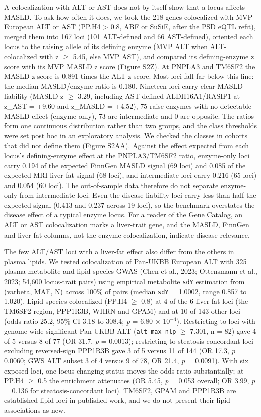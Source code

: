 A colocalization with ALT or AST does not by itself show that a locus affects MASLD. To ask how often it does, we took the 218 genes colocalized with MVP European ALT or AST (PP.H4 \textgreater{} 0.8, ABF or SuSiE, after the PSD eQTL refit), merged them into 167 loci (101 ALT-defined and 66 AST-defined), oriented each locus to the raising allele of its defining enzyme (MVP ALT when ALT-colocalized with \textbar z\textbar{} $\ge$ 5.45, else MVP AST), and compared its defining-enzyme z score with its MVP MASLD z score (Figure S2Z). At PNPLA3 and TM6SF2 the MASLD z score is 0.891 times the ALT z score. Most loci fall far below this line: the median MASLD/enzyme ratio is 0.180. Nineteen loci carry clear MASLD liability (MASLD z $\ge$ 3.29, including AST-defined ALDH16A1/RASIP1 at z\_AST = +9.60 and z\_MASLD = +4.52), 75 raise enzymes with no detectable MASLD effect (enzyme only), 73 are intermediate and 0 are opposite. The ratios form one continuous distribution rather than two groups, and the class thresholds were set post hoc in an exploratory analysis. We checked the classes in cohorts that did not define them (Figure S2AA). Against the effect expected from each locus's defining-enzyme effect at the PNPLA3/TM6SF2 ratio, enzyme-only loci carry 0.194 of the expected FinnGen MASLD signal (69 loci) and 0.085 of the expected MRI liver-fat signal (68 loci), and intermediate loci carry 0.216 (65 loci) and 0.054 (60 loci). The out-of-sample data therefore do not separate enzyme-only from intermediate loci. Even the disease-liability loci carry less than half the expected signal (0.413 and 0.237 across 19 loci), so the benchmark overstates the disease effect of a typical enzyme locus. For a reader of the Gene Catalog, an ALT or AST colocalization marks a liver-trait gene, and the MASLD, FinnGen and liver-fat columns, not the enzyme colocalization, indicate disease relevance.

The few ALT/AST loci with a liver-fat effect also differ from the others in plasma lipids. We tested colocalization of Pan-UKBB European ALT with 325 plasma metabolite and lipid-species GWAS (Chen et al., 2023; Ottensmann et al., 2023; 54,600 locus-trait pairs) using empirical metabolite \texttt{sdY} estimation from (varbeta, MAF, N) across 100\% of pairs (median \texttt{sdY} = 1.0002, range 0.857 to 1.020). Lipid species colocalized (PP.H4 $\ge$ 0.8) at 4 of the 6 liver-fat loci (the TM6SF2 region, PPP1R3B, WHRN and GPAM) and at 10 of 143 other loci (odds ratio 25.2, 95\% CI 3.18 to 308.4; \emph{p} = 6.80 $\times$ 10$^{-4}$). Restricting to loci with genome-wide significant Pan-UKBB ALT (\texttt{alt\_max\_nlp} $\ge$ 7.301, n = 82) gave 4 of 5 versus 8 of 77 (OR 31.7, \emph{p} = 0.0013); restricting to steatosis-concordant loci excluding reversed-sign PPP1R3B gave 3 of 5 versus 11 of 144 (OR 17.3, \emph{p} = 0.0060; GWS ALT subset 3 of 4 versus 9 of 78, OR 21.4, \emph{p} = 0.0091). With six exposed loci, one locus changing status moves the odds ratio substantially; at PP.H4 $\ge$ 0.5 the enrichment attenuates (OR 5.45, \emph{p} = 0.053 overall; OR 3.99, \emph{p} = 0.136 for steatosis-concordant loci). TM6SF2, GPAM and PPP1R3B are established lipid loci in published work, and we do not present their lipid associations as new.

